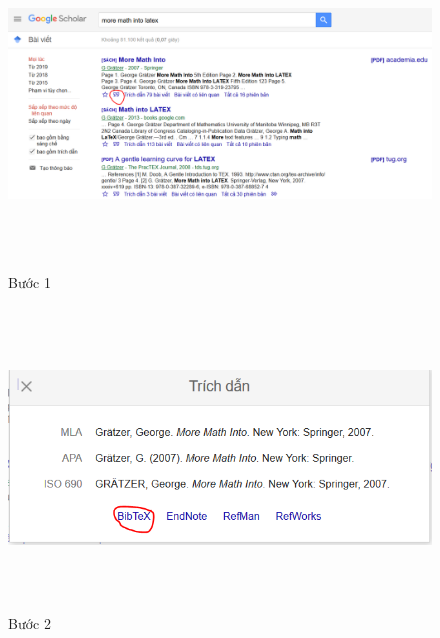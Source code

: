 \documentclass[a4paper]{article}
\begin{document}
\begin{figure}[!ht]
\begin{minipage}[b]{0.4\textwidth}
\centering
\includegraphics[height=8cm,width=12cm]{huongdan1}
\caption{Bước 1}\label{fig:*1}
\end{minipage}

\begin{minipage}[t]{0.4\textwidth}
\centering
\includegraphics[height=8cm,width=12cm]{huongdan2}
\caption{Bước 2}\label{fig:*2}
\end{minipage}
\end{figure}



\end{document}
